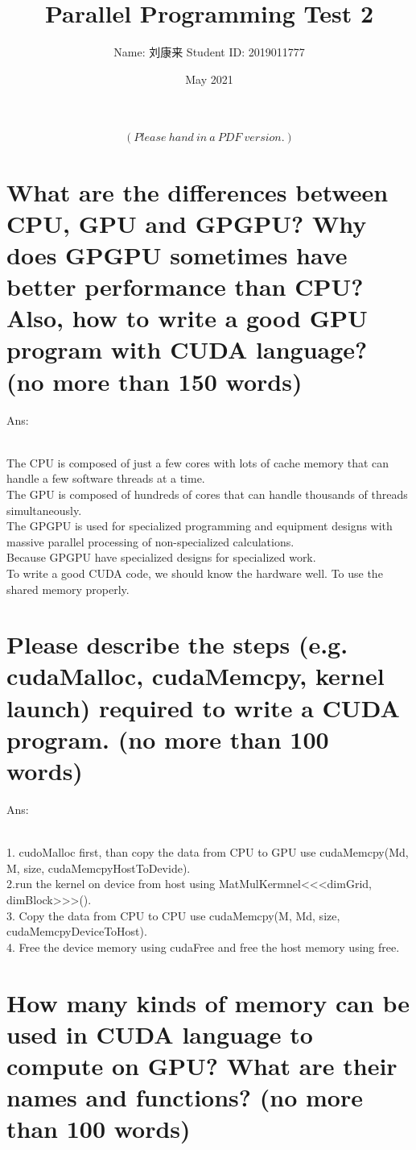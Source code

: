 \documentclass{article}
\title{Parallel Programming Test 2}
\author{Name: 刘康来  \qquad Student ID: 2019011777}
\date{May 2021}
\begin{document}
\maketitle
$$(Please\ hand\ in\ a\ PDF\ version.)$$

\section{What are the differences between CPU, GPU and GPGPU? Why does GPGPU sometimes have better performance than CPU? Also, how to write a good GPU program with CUDA language? (no more than 150 words)}

Ans:%

~\\The CPU is composed of just a few cores with lots of cache memory that can handle a few software threads at a time. 
\\The GPU is composed of hundreds of cores that can handle thousands of threads simultaneously.
\\The GPGPU is used for specialized programming and equipment designs with massive parallel processing of non-specialized calculations.
\\Because GPGPU have specialized designs for specialized work.
\\To write a good CUDA code, we should know the hardware well. To use the shared memory properly.

\section{Please describe the steps (e.g. cudaMalloc, cudaMemcpy, kernel launch) required to write a CUDA program. (no more than 100 words)}

Ans:%

~\\1. cudoMalloc first, than copy the data from CPU to GPU use cudaMemcpy(Md, M, size, cudaMemcpyHostToDevide).
\\2.run the kernel on device from host using MatMulKermnel<<<dimGrid, dimBlock>>>().
\\3. Copy the data from CPU to CPU use cudaMemcpy(M, Md, size, cudaMemcpyDeviceToHost).
\\4. Free the device memory using cudaFree and free the host memory using free.
\section{How many kinds of memory can be used in CUDA language to compute on GPU? What are their names and functions? (no more than 100 words)}
\end{document}
